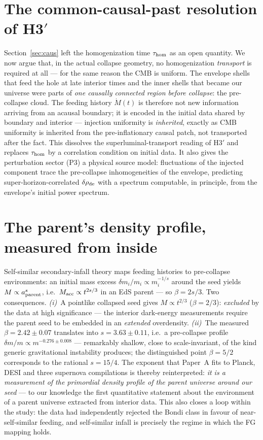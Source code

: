 \documentclass[11pt]{article}
\begin{document}
\section{The common-causal-past resolution of H3$'$}
Section~\ref{sec:caus} left the homogenization time $\tau_{\rm hom}$ as an open quantity. We now argue that, in the actual collapse geometry, no homogenization \emph{transport} is required at all --- for the same reason the CMB is uniform. The envelope shells that feed the hole at late interior times and the inner shells that became our universe were parts of \emph{one causally connected region before collapse}: the pre-collapse cloud. The feeding history $\dot M(t)$ is therefore not new information arriving from an acausal boundary; it is encoded in the initial data shared by boundary and interior --- injection uniformity is \emph{inherited}, exactly as CMB uniformity is inherited from the pre-inflationary causal patch, not transported after the fact. This dissolves the superluminal-transport reading of H3$'$ and replaces $\tau_{\rm hom}$ by a correlation condition on initial data. It also gives the perturbation sector (P3) a physical source model: fluctuations of the injected component trace the pre-collapse inhomogeneities of the envelope, predicting super-horizon-correlated $\delta\rho_{\rm de}$ with a spectrum computable, in principle, from the envelope's initial power spectrum.

\section{The parent's density profile, measured from inside}
Self-similar secondary-infall theory \cite{FG84,Bertschinger85} maps feeding histories to pre-collapse environments: an initial mass excess $\delta m_i/m_i \propto m_i^{-1/s}$ around the seed yields $M \propto a_{\rm parent}^{s}$, i.e.\ $M_{\rm acc} \propto t^{2s/3}$ in an EdS parent --- so $\beta = 2s/3$. Two consequences. \emph{(i)}~A pointlike collapsed seed gives $M \propto t^{2/3}$ ($\beta = 2/3$): \emph{excluded} by the data at high significance --- the interior dark-energy measurements require the parent seed to be embedded in an \emph{extended} overdensity. \emph{(ii)}~The measured $\beta = 2.42 \pm 0.07$ translates into $s = 3.63 \pm 0.11$, i.e.\ a pre-collapse profile $\delta m/m \propto m^{-0.276 \pm 0.008}$ --- remarkably shallow, close to scale-invariant, of the kind generic gravitational instability produces; the distinguished point $\beta = 5/2$ corresponds to the rational $s = 15/4$. The exponent that Paper~A fits to Planck, DESI and three supernova compilations is thereby reinterpreted: \emph{it is a measurement of the primordial density profile of the parent universe around our seed} --- to our knowledge the first quantitative statement about the environment of a parent universe extracted from interior data. This also closes a loop within the study: the data had independently rejected the Bondi class in favour of near-self-similar feeding, and self-similar infall is precisely the regime in which the FG mapping holds.
\end{document}
